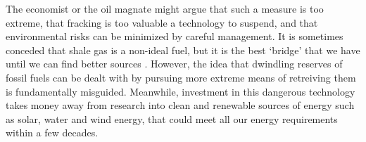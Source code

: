 \documentclass[12pt,letterpaper]{article}
\begin{document}
The economist or the oil magnate might argue that such a measure is too extreme, that fracking is too valuable a technology to suspend, and that environmental risks can be minimized by careful management. It is sometimes conceded that shale gas is a non-ideal fuel, but it is the best `bridge' that we have until we can find better sources \cite{bridge}. However, the idea that dwindling reserves of fossil fuels can be dealt with by pursuing more extreme means of retreiving them is fundamentally misguided. Meanwhile, investment in this dangerous technology takes money away from research into clean and renewable sources of energy such as solar, water and wind energy, that could meet all our energy requirements within a few decades\cite[58]{sciam}.


\makeworkscited
\end{document}
